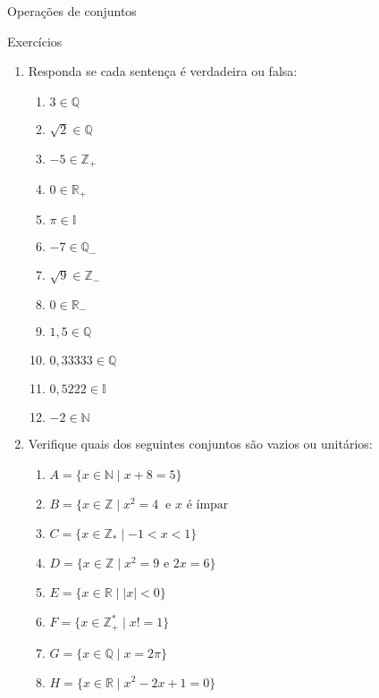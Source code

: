 \documentclass[14pt, aspectratio=169]{beamer}
\newcommand{\R}{\mathbb{R}}
\newcommand{\I}{\mathbb{I}}
\newcommand{\Q}{\mathbb{Q}}
\newcommand{\Z}{\mathbb{Z}}
\newcommand{\N}{\mathbb{N}}
\begin{document}
\begin{frame}[allowframebreaks]{Operações de conjuntos}
\end{frame}

\begin{frame}[allowframebreaks]{Exercícios}

\begin{enumerate}
    \item Responda se cada sentença é verdadeira ou falsa:

    \begin{multicols}{3}
        \begin{enumerate}[a]
                \item $3 \in \Q$
                \item $\sqrt{2} \in \Q$
                \item $-5 \in \Z_+$
                \item $0 \in \R_+$
                \item $\pi \in \I$
                \item $-7 \in \Q_-$
                \item $\sqrt{9} \in \Z_-$
                \item $0 \in \R_-$
                \item $1,5 \in \Q$
                \item $0,33333 \in \Q$
                \item $0,5222 \in \I$
                \item $-2 \in \N$
            \end{enumerate}
    \end{multicols}

    \vspace{5.0cm}

    \item Verifique quais dos seguintes conjuntos são vazios ou unitários:

    \begin{multicols}{2}
        \begin{enumerate}[a]
                \item $A = \{ x \in \N \mid x + 8 = 5 \}$
                \item $B = \{ x \in \Z \mid x^2 = 4 \ \text{ e $x$ é ímpar}$
                \item $C = \{ x \in \Z_* \mid -1 < x < 1 \}$
                \item $D = \{ x \in \Z \mid x^2 = 9 \text{ e } 2x = 6 \}$
                \item $E = \{ x \in \R \mid \mid x \mid < 0 \}$
                \item $F = \{ x \in \Z_+^* \mid x! = 1 \}$
                \item $G = \{ x \in \Q \mid x = 2\pi \}$
                \item $H = \{ x \in \R \mid x^2 - 2x + 1 = 0 \}$
            \end{enumerate}
    \end{multicols}


\end{enumerate}
\end{frame}
\end{document}
